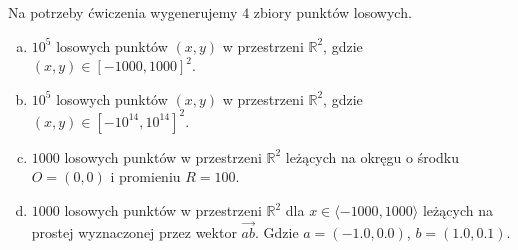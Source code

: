 \quad Na potrzeby ćwiczenia wygenerujemy $4$ zbiory punktów losowych.
\begin{enumerate}[a)]
    \item $10^5$ losowych punktów $(x, y)$ w przestrzeni $\mathbb{R}^2$, gdzie $(x, y) \in \left[-1000,1000\right]^{2}$.
    \item $10^5$ losowych punktów $(x, y)$ w przestrzeni $\mathbb{R}^2$, gdzie $(x, y) \in \left[-10^{14},10^{14}\right]^{2}$.
    \item $1000$ losowych punktów w przestrzeni $\mathbb{R}^2$ leżących na okręgu o środku $ O = (0,0)$ i promieniu $ R = 100$.
    \item $ 1000$ losowych punktów w przestrzeni $\mathbb{R}^2$ dla $ x \in \langle -1000,1000 \rangle$ leżących na prostej wyznaczonej przez wektor $ \overrightarrow{ab}$.   
    Gdzie $ a = (-1.0, 0.0)$, $ b = (1.0, 0.1)$.
\end{enumerate}
